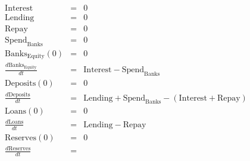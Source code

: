\documentclass{article}
\begin{document}
\begin{eqnarray*}
\mathrm{Interest}&=&0\\
\mathrm{Lending}&=&0\\
\mathrm{Repay}&=&0\\
\mathrm{Spend}_{\mathrm{{Banks}}}&=&0\\
\mathrm{Banks}_{\mathrm{{Equity}}}(0)&=&0\\
\frac{ d \mathrm{Banks}_{\mathrm{{Equity}}}}{dt} &=&\mathrm{Interest}-\mathrm{Spend}_{\mathrm{{Banks}}}\\
\mathrm{Deposits}(0)&=&0\\
\frac{ d \mathrm{Deposits}}{dt} &=&\mathrm{Lending}+\mathrm{Spend}_{\mathrm{{Banks}}}-\left(\mathrm{Interest}+\mathrm{Repay}\right)\\
\mathrm{Loans}(0)&=&0\\
\frac{ d \mathrm{Loans}}{dt} &=&\mathrm{Lending}-\mathrm{Repay}\\
\mathrm{Reserves}(0)&=&0\\
\frac{ d \mathrm{Reserves}}{dt} &=&\\
\end{eqnarray*}
\end{document}
